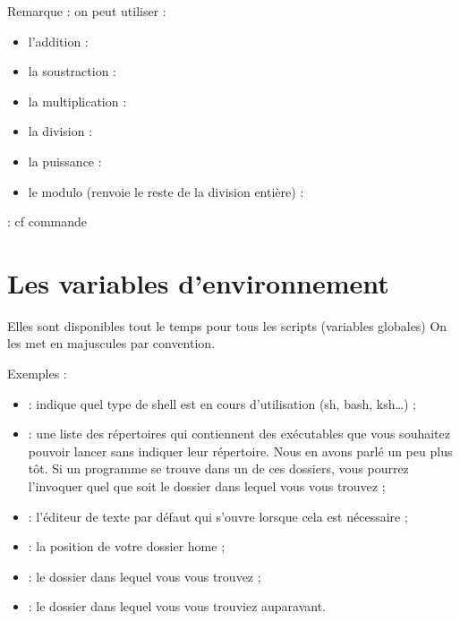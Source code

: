 \documentclass[letterpaper,10pt,french]{sphinxmanual}
\begin{document}
Remarque : on peut utiliser : 

\begin{itemize}
\item {} 
l’addition : \sphinxcode{\sphinxupquote{+}}

\item {} 
la soustraction : \sphinxcode{\sphinxupquote{-}}

\item {} 
la multiplication : \sphinxcode{\sphinxupquote{*}}

\item {} 
la division : \sphinxcode{\sphinxupquote{/}}

\item {} 
la puissance : \sphinxcode{\sphinxupquote{**}}

\item {} 
le modulo (renvoie le reste de la division entière) : \sphinxcode{\sphinxupquote{\%}}

\end{itemize}

 : cf commande 


\section{Les variables d’environnement}
\label{\detokenize{21-scripts-shell:les-variables-d-environnement}}
Elles sont disponibles tout le temps pour tous les scripts (variables globales) On les met en majuscules par convention.

Exemples :
\begin{itemize}
\item {} 
 : indique quel type de shell est en cours d’utilisation (sh, bash, ksh…) ;

\item {} 
 : une liste des répertoires qui contiennent des exécutables que vous souhaitez pouvoir lancer sans indiquer leur répertoire. Nous en avons parlé un peu plus tôt. Si un programme se trouve dans un de ces dossiers, vous pourrez l’invoquer quel que soit le dossier dans lequel vous vous trouvez ;

\item {} 
 : l’éditeur de texte par défaut qui s’ouvre lorsque cela est nécessaire ;

\item {} 
 : la position de votre dossier home ;

\item {} 
 : le dossier dans lequel vous vous trouvez ;

\item {} 
 : le dossier dans lequel vous vous trouviez auparavant.

\end{itemize}
\end{document}
